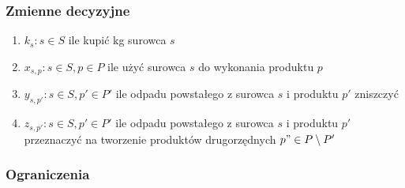 \documentclass[a4paper,11pt]{article}
\theoremstyle{mytheor}
\begin{document}
\subsubsection*{Zmienne decyzyjne}
\begin{enumerate}
    \item $k_s: s\in S$ ile kupić kg surowca $s$
    \item $x_{s,p}: s\in S, p\in P$ ile użyć surowca $s$ do wykonania produktu $p$
    \item $y_{s,p'}: s\in S, p'\in P'$ ile odpadu powstałego z surowca $s$ i produktu $p'$ zniszczyć
    \item $z_{s,p'}: s\in S, p'\in P'$ ile odpadu powstałego z surowca $s$ i produktu $p'$ przeznaczyć na tworzenie produktów drugorzędnych $p"\in P\setminus P'$
\end{enumerate}
\subsubsection*{Ograniczenia}
\end{document}
